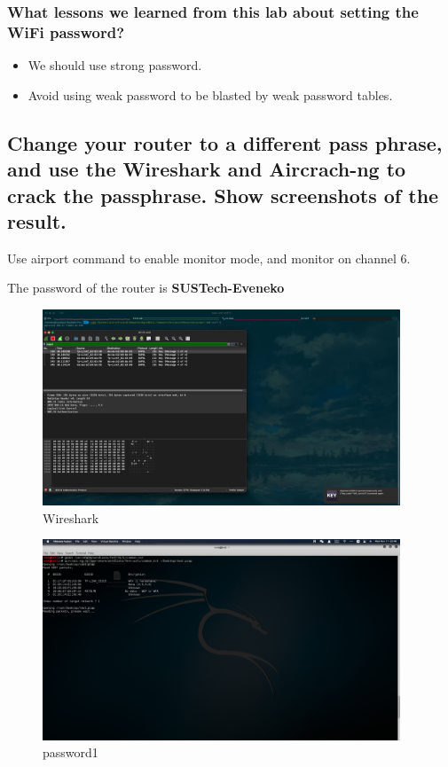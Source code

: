 \documentclass[onecolumn,oneside]{SUSTechHomework}
\begin{document}
      \subsubsection{What lessons we learned from this lab about setting the WiFi password?}

      \begin{itemize}
        \item We should use strong password.
        \item Avoid using weak password to be blasted by weak password tables.
      \end{itemize}

    \subsection{Change your router to a different pass phrase, and use the Wireshark and Aircrach-ng to crack the passphrase. Show screenshots of the result.}

    Use airport command to enable monitor mode, and monitor on channel 6.

    The password of the router is \textbf{SUSTech-Eveneko}

      \begin{figure}[H]
        \centering
        \includegraphics[width=0.95\textwidth]{img/pic3.png}
        \caption{Wireshark}
      \end{figure}

      \begin{figure}[H]
        \centering
        \includegraphics[width=0.95\textwidth]{img/pic4.png}
        \caption{password1}
      \end{figure}
\end{document}
